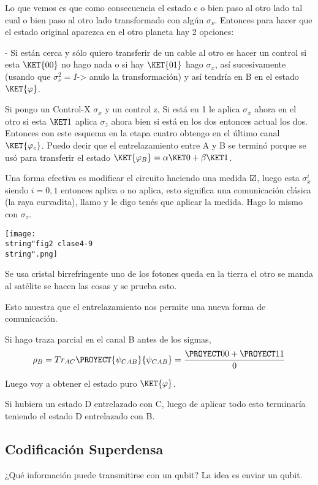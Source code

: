 Lo que vemos es que como consecuencia el estado c o bien paso al otro
lado tal cual o bien paso al otro lado transformado con algún $\sigma_{\nu}$.
Entonces para hacer que el estado original aparezca en el otro planeta
hay 2 opciones:

- Si están cerca y sólo quiero transferir de un cable al otro es hacer
un control si esta $\KET{00}$ no hago nada o si hay $\KET{01}$ hago
$\sigma_{x}$, así sucesivamente (usando que $\sigma_{\nu}^{2}=I$->
anulo la transformación) y así tendría en B en el estado $\KET{\varphi}$.

Si pongo un Control-X $\sigma_{x}$ y un control z, Si está en 1 le
aplica $\sigma_{x}$ ahora en el otro si esta $\KET 1$ aplica $\sigma_{z}$
ahora bien si está en los dos entonces actual los dos. Entonces con
este esquema en la etapa cuatro obtengo en el último canal $\KET{\varphi_{c}}$.
Puedo decir que el entrelazamiento entre A y B se terminó porque se
usó para transferir el estado $\KET{\varphi_{B}}=\alpha\KET 0+\beta\KET 1$. 

Una forma efectiva es modificar el circuito haciendo una medida $\CheckedBox$,
luego esta $\sigma_{x}^{i}$ siendo $i=0,1$ entonces aplica o no
aplica, esto significa una comunicación clásica (la raya curvadita),
llamo y le digo tenés que aplicar la medida. Hago lo mismo con $\sigma_{z}$.
\begin{center}
\texttt{[image: \\string"fig2 clase4-9\\string".png]}
\par\end{center}

Se usa cristal birrefringente uno de los fotones queda en la tierra
el otro se manda al satélite se hacen las cosas y se prueba esto.

Esto muestra que el entrelazamiento nos permite una nueva forma de
comunicación.

Si hago traza parcial en el canal B antes de los sigmas, 
\[
\rho_{B}=Tr_{AC}\PROYECT{\psi_{CAB}}{\psi_{CAB}}=\frac{\PROYECT 00+\PROYECT 11}{0}
\]

Luego voy a obtener el estado puro $\KET{\varphi}$.

Si hubiera un estado D entrelazado con C, luego de aplicar todo esto
terminaría teniendo el estado D entrelazado con B.

\subsection{Codificación Superdensa}

¿Qué información puede transmitirse con un qubit? La idea es enviar
un qubit. 

